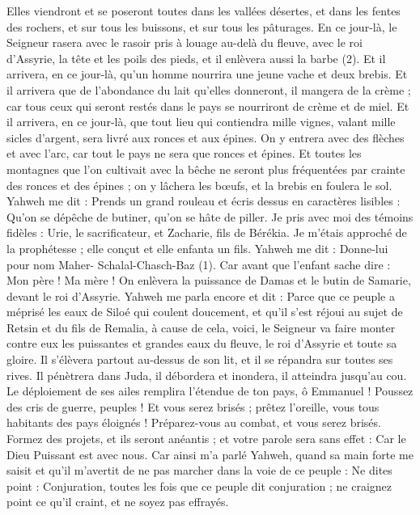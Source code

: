 \begin{multicols}{2}
Elles viendront et se poseront toutes dans les vallées désertes, et dans les fentes des rochers, et sur tous les buissons, et sur tous les pâturages.
En ce jour-là, le Seigneur rasera avec le rasoir pris à louage au-delà du fleuve, avec le roi d'Assyrie, la tête et les poils des pieds, et il enlèvera aussi la barbe (2).
Et il arrivera, en ce jour-là, qu'un homme nourrira une jeune vache et deux brebis.
Et il arrivera que de l'abondance du lait qu'elles donneront, il mangera de la crème ; car tous ceux qui seront restés dans le pays se nourriront de crème et de miel.
Et il arrivera, en ce jour-là, que tout lieu qui contiendra mille vignes, valant mille sicles d'argent, sera livré aux ronces et aux épines.
On y entrera avec des flèches et avec l'arc, car tout le pays ne sera que ronces et épines.
Et toutes les montagnes que l’on cultivait avec la bêche ne seront plus fréquentées par crainte des ronces et des épines ; on y lâchera les bœufs, et la brebis en foulera le sol.
\VerseOne{}Yahweh me dit : Prends un grand rouleau et écris dessus en caractères lisibles : Qu’on se dépêche de butiner, qu’on se hâte de piller.
Je pris avec moi des témoins fidèles : Urie, le sacrificateur, et Zacharie, fils de Bérékia.
Je m’étais approché de la prophétesse ; elle conçut et elle enfanta un fils. Yahweh me dit : Donne-lui pour nom Maher- Schalal-Chasch-Baz (1).
Car avant que l'enfant sache dire : Mon père ! Ma mère ! On enlèvera la puissance de Damas et le butin de Samarie, devant le roi d'Assyrie.
Yahweh me parla encore et dit :
Parce que ce peuple a méprisé les eaux de Siloé qui coulent doucement, et qu'il s'est réjoui au sujet de Retsin et du fils de Remalia,
à cause de cela, voici, le Seigneur va faire monter contre eux les puissantes et grandes eaux du fleuve, le roi d'Assyrie et toute sa gloire. Il s’élèvera partout au-dessus de son lit, et il se répandra sur toutes ses rives.
Il pénètrera dans Juda, il débordera et inondera, il atteindra jusqu’au cou. Le déploiement de ses ailes remplira l’étendue de ton pays, ô Emmanuel !
Poussez des cris de guerre, peuples ! Et vous serez brisés ; prêtez l'oreille, vous tous habitants des pays éloignés ! Préparez-vous au combat, et vous serez brisés.
Formez des projets, et ils seront anéantis ; et votre parole sera sans effet : Car le Dieu Puissant est avec nous.
Car ainsi m'a parlé Yahweh, quand sa main forte me saisit et qu’il m’avertit de ne pas marcher dans la voie de ce peuple :
Ne dites point : Conjuration, toutes les fois que ce peuple dit conjuration ; ne craignez point ce qu'il craint, et ne soyez pas effrayés.

\end{multicols}
